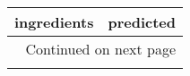 \begin{longtable}{p{7cm}p{7cm}}
\toprule
                                                                                                                                                                                                                                                                                            ingredients &                                                                                                                                                                                                                                                                                                                                                                                                                                                               predicted \\
\midrule
\endhead
\midrule
\multicolumn{2}{r}{{Continued on next page}} \\
\midrule
\endfoot


\end{longtable}
